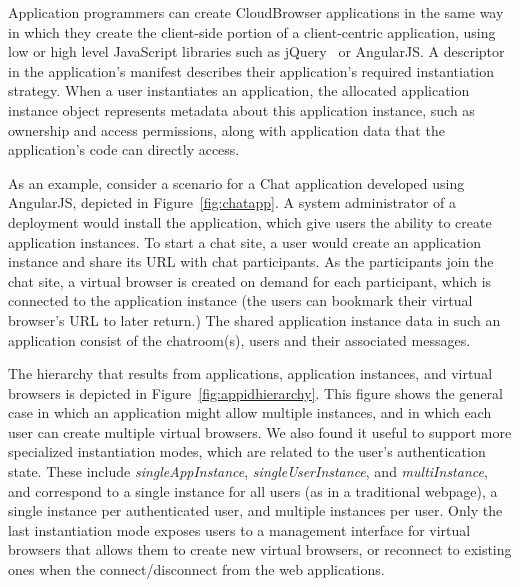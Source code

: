 Application programmers can create CloudBrowser applications in the same way in which 
they create the client-side portion of a client-centric application, using low or high level
JavaScript libraries such as jQuery~\cite{jquery} or AngularJS.  A descriptor in the 
application's manifest describes their application's required instantiation strategy.
When a user instantiates an application, the allocated application instance object 
represents metadata about this application instance, such as ownership and access permissions, 
along with application data that the application's code can directly access.  

\chatappfig{}
As an example, consider a scenario for a Chat application developed using AngularJS, 
depicted in Figure~\ref{fig:chatapp}.
A system administrator of a \cb deployment would install the application, which give users the
ability to create application instances. To start a chat site, a user would create
an application instance and share its URL with chat participants.  As the participants join
the chat site, a virtual browser is created on demand for each participant, which is connected 
to the application instance (the users can bookmark their virtual browser's URL to later return.)
The shared application instance data in such an application 
consist of the chatroom(s), users and their associated messages.  

The hierarchy that results from applications, application instances, and virtual browsers is
depicted in Figure~\ref{fig:appidhierarchy}.  This figure shows the general case in which an
application might allow multiple instances, and in which each user can create multiple virtual
browsers.  We also found it useful to support more specialized instantiation modes, which are
related to the user's authentication state.   These include \emph{singleAppInstance},
\emph{singleUserInstance}, and \emph{multiInstance}, and correspond to a single instance
for all users (as in a traditional webpage), a single instance per authenticated user,
and multiple instances per user.    Only the last instantiation mode exposes users to
a management interface for virtual browsers that allows them to create new virtual browsers,
or reconnect to existing ones when the connect/disconnect from the web applications.

